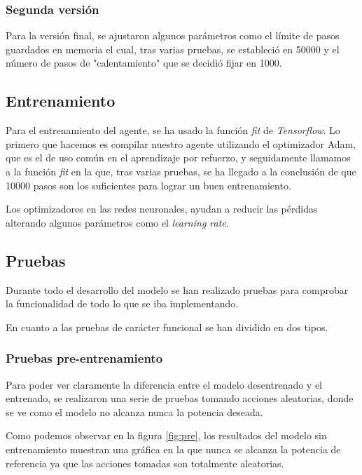\subsubsection{Segunda versión}

Para la versión final, se ajustaron algunos parámetros como el límite de pasos guardados en memoria el cual, tras varias pruebas, se estableció en 50000 y el número de pasos de "calentamiento" que se decidió fijar en 1000.

\subsection{Entrenamiento}

Para el entrenamiento del agente, se ha usado la función \textit{fit} de \textit{Tensorflow}. 
Lo primero que hacemos es compilar nuestro agente utilizando el optimizador Adam, que es el de uso común en el aprendizaje por refuerzo, y seguidamente llamamos a la función \textit{fit} en la que, tras varias pruebas, se ha llegado a la conclusión de que 10000 pasos son los suficientes para lograr un buen entrenamiento.

Los optimizadores en las redes neuronales, ayudan a reducir las pérdidas alterando algunos parámetros como el \textit{learning rate}.

\subsection{Pruebas}

Durante todo el desarrollo del modelo se han realizado pruebas para comprobar la funcionalidad de todo lo que se iba implementando.

En cuanto a las pruebas de carácter funcional se han dividido en dos tipos.

\subsubsection{Pruebas pre-entrenamiento}

Para poder ver claramente la diferencia entre el modelo desentrenado y el entrenado, se realizaron una serie de pruebas tomando acciones aleatorias, donde se ve como el modelo no alcanza nunca la potencia deseada.

\label{fig:pre}

Como podemos observar en la figura \ref{fig:pre}, los resultados del modelo sin entrenamiento muestran una gráfica en la que nunca se alcanza la potencia de referencia ya que las acciones tomadas son totalmente aleatorias.

